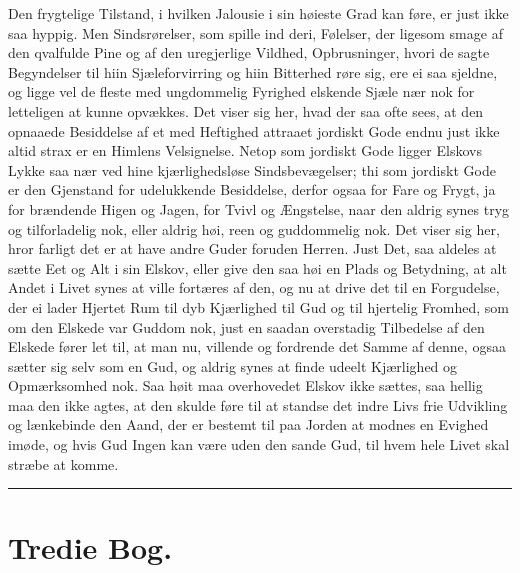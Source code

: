 \documentclass[12pt,a4paper]{book}
\newcommand{\apage}[1]{\marginnote{\footnotesize\textit{[#1]}}}
\begin{document}
Den frygtelige Tilstand, i hvilken Jalousie i sin høieste Grad kan føre,
er just ikke saa hyppig. Men Sindsrørelser, som spille ind deri,
Følelser, der ligesom smage af den qvalfulde Pine og af den uregjerlige
Vildhed, Opbrusninger, hvori de sagte Begyndelser til hiin
Sjæleforvirring og hiin Bitterhed røre sig, ere ei saa sjeldne, og ligge
vel de fleste med ungdommelig Fyrighed \apage{129} elskende Sjæle nær nok for
letteligen at kunne opvækkes. Det viser sig her, hvad der saa ofte sees,
at den opnaaede Besiddelse af et med Heftighed attraaet jordiskt Gode
endnu just ikke altid strax er en Himlens Velsignelse. Netop som
jordiskt Gode ligger Elskovs Lykke saa nær ved hine kjærlighedsløse
Sindsbevægelser; thi som jordiskt Gode er den Gjenstand for udelukkende
Besiddelse, derfor ogsaa for Fare og Frygt, ja for brændende Higen og
Jagen, for Tvivl og Ængstelse, naar den aldrig synes tryg og
tilforladelig nok, eller aldrig høi, reen og guddommelig nok. Det viser
sig her, hror farligt det er at have andre Guder foruden Herren. Just
Det, saa aldeles at sætte Eet og Alt i sin Elskov, eller give den saa
høi en Plads og Betydning, at alt Andet i Livet synes at ville fortæres
af den, og nu at drive det til en Forgudelse, der ei lader Hjertet Rum
til dyb Kjærlighed til Gud og til hjertelig Fromhed, som om den Elskede
var Guddom nok, just en saadan overstadig Tilbedelse af den Elskede
fører let til, at man nu, villende og fordrende det Samme af denne, ogsaa
sætter sig selv som en Gud, og aldrig synes at finde udeelt Kjærlighed
og Opmærksomhed nok. Saa høit maa overhovedet Elskov ikke sættes, saa
hellig maa den ikke agtes, at den skulde føre til at standse det indre
Livs frie Udvikling og lænkebinde den Aand, der er bestemt til paa
Jorden at modnes en Evighed imøde, og hvis Gud Ingen kan være uden den
sande Gud, til hvem hele Livet skal stræbe at komme.

\begin{center}\rule{0.28\linewidth}{0.4pt}\end{center}

\chapter*{Tredie Bog.}
 \apage{130}
\end{document}
